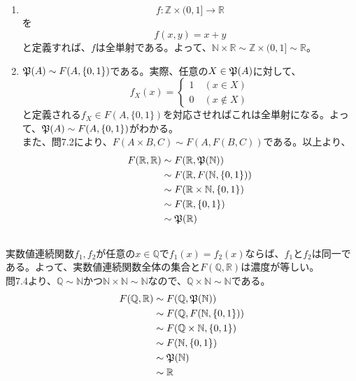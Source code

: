 \documentclass{jsarticle}
\begin{document}
\subsection{}
\begin{enumerate}
\item
\[f:\mathbb{Z}\times(0,1]\to\mathbb{R}\]を\[f(x,y)=x+y\]と定義すれば、$f$は全単射である。よって、$\mathbb{N}\times\mathbb{R}\sim\mathbb{Z}\times(0,1]\sim\mathbb{R}$。

\item
$\frak{P}(A)\sim F(A,\{0,1\})$である。実際、任意の$X\in\frak{P}(A)$に対して、
\[f_X(x)=
\begin{cases}
1 \quad(x\in X)\\
0 \quad(x\notin X)
\end{cases}
\]
と定義される$f_X\in F(A,\{0,1\})$を対応させればこれは全単射になる。よって、$\frak{P}(A)\sim F(A,\{0,1\})$がわかる。\\
また、問7.2により、$F(A\times B,C)\sim F(A,F(B,C))$である。以上より、
\begin{align*}
F(\mathbb{R},\mathbb{R})&\sim F(\mathbb{R},\frak{P}(\mathbb{N}))\\
&\sim F(\mathbb{R},F(\mathbb{N},\{0,1\}))\\
&\sim F(\mathbb{R}\times\mathbb{N},\{0,1\})\\
&\sim F(\mathbb{R},\{0,1\})\\
&\sim \frak{P}(\mathbb{R})
\end{align*}
\end{enumerate}

\subsection{}
実数値連続関数$f_1,f_2$が任意の$x\in\mathbb{Q}$で$f_1(x)=f_2(x)$ならば、$f_1$と$f_2$は同一である。よって、実数値連続関数全体の集合と$F(\mathbb{Q},\mathbb{R})$は濃度が等しい。\\
問7.4より、$\mathbb{Q}\sim\mathbb{N}$かつ$\mathbb{N}\times\mathbb{N}\sim\mathbb{N}$なので、$\mathbb{Q}\times\mathbb{N}\sim\mathbb{N}$である。
\begin{align*}
F(\mathbb{Q},\mathbb{R})&\sim F(\mathbb{Q}, \frak{P}(\mathbb{N}))\\
&\sim F(\mathbb{Q},F(\mathbb{N},\{0,1\}))\\
&\sim F(\mathbb{Q}\times\mathbb{N}, \{0,1\})\\
&\sim F(\mathbb{N},\{0,1\})\\
&\sim \frak{P}(\mathbb{N})\\
&\sim \mathbb{R}
\end{align*}
\end{document}
